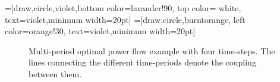 
\def\lav{lavander!90}
\def\oran{orange!30}

=[draw,circle,violet,bottom color=\lav,
                  top color= white, text=violet,minimum width=20pt]
=[draw,circle,burntorange, left color=\oran,
                       text=violet,minimum width=20pt]

\begin{figure}[h!]
\centering
{}
\caption{Multi-period optimal power flow example with four time-steps. The lines connecting the different time-periods denote the coupling between them.}
\label{fig:tcopflow}
\end{figure}
